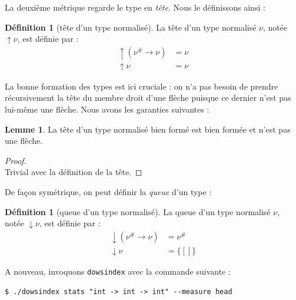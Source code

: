 \documentclass[a4paper]{report}
\newenvironment{preuve} 
  {\begin{proof}~\\} 
  {\end{proof}}
\theoremstyle{definition}
\newtheorem{definition}[theoreme]{Définition}
\newtheorem{lemme}[theoreme]{Lemme}
\newcommand{\dowsindex}{\texttt{dowsindex}\xspace}
\newcommand{\mset}[1]{\{\![#1]\!\}}
\begin{document}
La deuxième métrique regarde le type en \emph{tête}. Nous le définissons ainsi :

\begin{definition}[tête d'un type normalisé]
  La tête d'un type normalisé $\nu$, notée $\uparrow \nu$, est définie par :
  \begin{align*}
      \uparrow (\nu^\# \rightarrow \nu) &=
      \nu
    \\
      \uparrow \nu &=
      \nu
  \end{align*}
\end{definition}

La bonne formation des types est ici cruciale : on n'a pas besoin de prendre récursivement la tête du membre droit d'une flèche puisque ce dernier n'est pas lui-même une flèche. Nous avons les garanties suivantes :

\begin{lemme} \label{bf_implique_tete_bf_et_non_fleche}
  La tête d'un type normalisé bien formé est bien formée et n'est pas une flèche.
\end{lemme}

\begin{preuve}
  Trivial avec la définition de la tête.
\end{preuve}

De façon symétrique, on peut définir la \emph{queue} d'un type :

\begin{definition}[queue d'un type normalisé]
  La queue d'un type normalisé $\nu$, notée $\downarrow \nu$, est définie par :
  \begin{align*}
      \downarrow (\nu^\# \rightarrow \nu) &=
      \nu^\#
    \\
      \downarrow \nu &=
      \mset{}
  \end{align*}
\end{definition}

A nouveau, invoquons \dowsindex avec la commande suivante :

\begin{verbatim}
$ ./dowsindex stats "int -> int -> int" --measure head
\end{verbatim}
\end{document}
